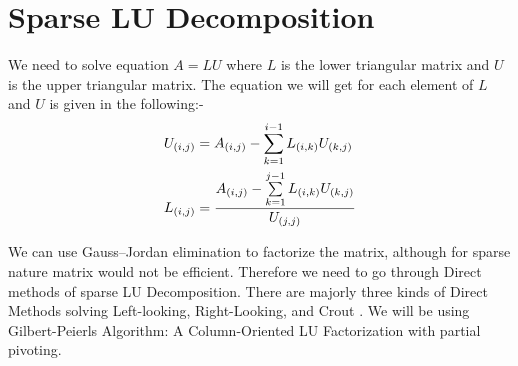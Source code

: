 \section{Sparse LU Decomposition}

We need to solve equation $A=LU$ where $L$ is the lower triangular matrix and $U$ is the upper triangular matrix. The equation we will get for each element of $L$ and $U$ is given in the following:-
\begin{subequations}
    \centering
    \begin{align}
        U_{(i,j)} & = A_{(i,j)} - \sum\limits_{k = 1}^{i-1} L_{(i,k)}U_{(k,j)} \\
        L_{(i,j)} & = \frac{A_{(i,j)} - \sum\limits_{k = 1}^{j-1} L_{(i,k)}U_{(k,j)}}{U_{(j,j)}}
    \end{align}
    \label{eqn:LUD:LUequation}
\end{subequations}


We can use Gauss–Jordan elimination to factorize the matrix, although for sparse nature matrix would not be efficient. Therefore we need to go through Direct methods of sparse LU Decomposition. There are majorly three kinds of Direct Methods solving Left-looking, Right-Looking, and Crout \cite{crout}. We will be using Gilbert-Peierls Algorithm: A Column-Oriented LU Factorization with partial pivoting.
